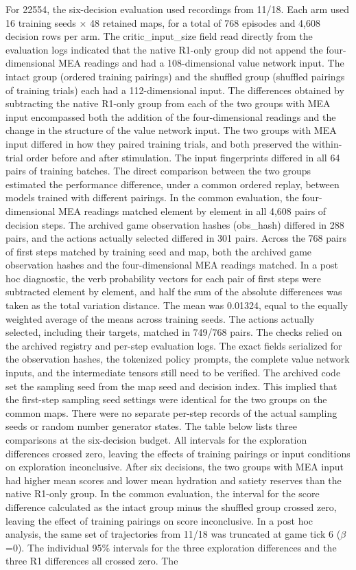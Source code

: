 \documentclass{article}
\begin{document}
For 22554, the six-decision evaluation used recordings from 11/18. Each arm used 16 training seeds \ensuremath{\times} 48 retained maps, for a total of 768 episodes and 4,608 decision rows per arm. The critic\_\allowbreak{}input\_\allowbreak{}size field read directly from the evaluation logs indicated that the native R1-only group did not append the four-dimensional MEA readings and had a 108-dimensional value network input. The intact group (ordered training pairings) and the shuffled group (shuffled pairings of training trials) each had a 112-dimensional input. The differences obtained by subtracting the native R1-only group from each of the two groups with MEA input encompassed both the addition of the four-dimensional readings and the change in the structure of the value network input. The two groups with MEA input differed in how they paired training trials, and both preserved the within-trial order before and after stimulation. The input fingerprints differed in all 64 pairs of training batches. The direct comparison between the two groups estimated the performance difference, under a common ordered replay, between models trained with different pairings. In the common evaluation, the four-dimensional MEA readings matched element by element in all 4,608 pairs of decision steps. The archived game observation hashes (obs\_\allowbreak{}hash) differed in 288 pairs, and the actions actually selected differed in 301 pairs. Across the 768 pairs of first steps matched by training seed and map, both the archived game observation hashes and the four-dimensional MEA readings matched. In a post hoc diagnostic, the verb probability vectors for each pair of first steps were subtracted element by element, and half the sum of the absolute differences was taken as the total variation distance. The mean was 0.01324, equal to the equally weighted average of the means across training seeds. The actions actually selected, including their targets, matched in 749/768 pairs. The checks relied on the archived registry and per-step evaluation logs. The exact fields serialized for the observation hashes, the tokenized policy prompts, the complete value network inputs, and the intermediate tensors still need to be verified. The archived code set the sampling seed from the map seed and decision index. This implied that the first-step sampling seed settings were identical for the two groups on the common maps. There were no separate per-step records of the actual sampling seeds or random number generator states. The table below lists three comparisons at the six-decision budget. All intervals for the exploration differences crossed zero, leaving the effects of training pairings or input conditions on exploration inconclusive. After six decisions, the two groups with MEA input had higher mean scores and lower mean hydration and satiety reserves than the native R1-only group. In the common evaluation, the interval for the score difference calculated as the intact group minus the shuffled group crossed zero, leaving the effect of training pairings on score inconclusive. In a post hoc analysis, the same set of trajectories from 11/18 was truncated at game tick 6 (\ensuremath{\beta}=0). The individual 95\% intervals for the three exploration differences and the three R1 differences all crossed zero. The 
\end{document}
